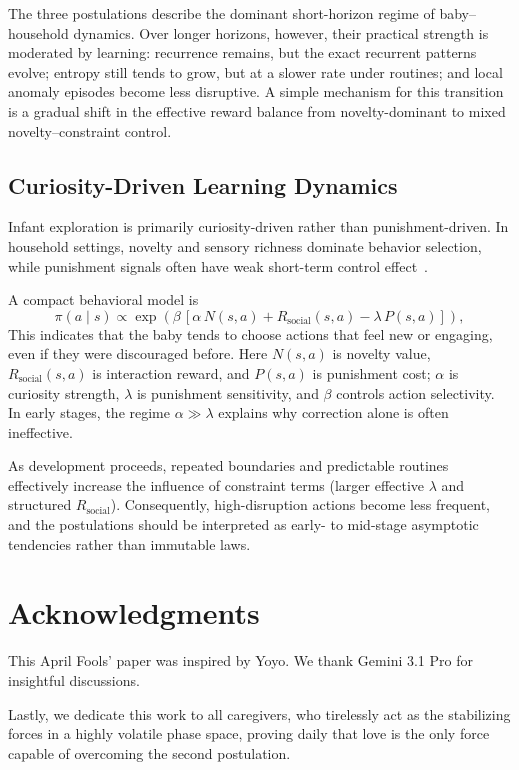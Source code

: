 \documentclass[11pt]{article}
\begin{document}
The three postulations describe the dominant short-horizon regime of baby--household dynamics. Over longer horizons, however, their practical strength is moderated by learning: recurrence remains, but the exact recurrent patterns evolve; entropy still tends to grow, but at a slower rate under routines; and local anomaly episodes become less disruptive. A simple mechanism for this transition is a gradual shift in the effective reward balance from novelty-dominant to mixed novelty--constraint control.

\subsection{Curiosity-Driven Learning Dynamics}

Infant exploration is primarily curiosity-driven rather than punishment-driven. In household settings, novelty and sensory richness dominate behavior selection, while punishment signals often have weak short-term control effect~\cite{SuttonBarto2018,OudeyerKaplan2007}.

A compact behavioral model is
\begin{equation}
\pi(a\mid s) \propto \exp\!\left(\beta\,[\alpha\,N(s,a)+R_{\text{social}}(s,a)-\lambda\,P(s,a)]\right),
\end{equation}
This indicates that the baby tends to choose actions that feel new or engaging, even if they were discouraged before. Here $N(s,a)$ is novelty value, $R_{\text{social}}(s,a)$ is interaction reward, and $P(s,a)$ is punishment cost; $\alpha$ is curiosity strength, $\lambda$ is punishment sensitivity, and $\beta$ controls action selectivity. In early stages, the regime $\alpha\gg\lambda$ explains why correction alone is often ineffective.

As development proceeds, repeated boundaries and predictable routines effectively increase the influence of constraint terms (larger effective $\lambda$ and structured $R_{\text{social}}$). Consequently, high-disruption actions become less frequent, and the postulations should be interpreted as early- to mid-stage asymptotic tendencies rather than immutable laws.


\section*{Acknowledgments}

This April Fools' paper was inspired by Yoyo. We thank Gemini 3.1 Pro for insightful discussions.

Lastly, we dedicate this work to all caregivers, who tirelessly act as the stabilizing forces in a highly volatile phase space, proving daily that love is the only force capable of overcoming the second postulation.







\end{document}
